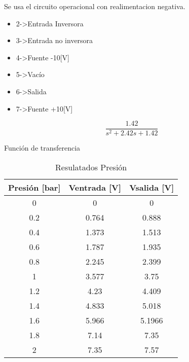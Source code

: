 \documentclass[]{article}
\begin{document}

Se usa el circuito operacional con realimentacion negativa.\\

\begin{itemize}
	
	\item 2->Entrada Inversora
	\item 3->Entrada no inversora
	\item 4->Fuente -10[V]
	\item 5->Vacío
	\item 6->Salida
	\item 7->Fuente +10[V]
\end{itemize}

\begin{equation}
  \frac{1.42}{s^2+2.42s+1.42}
\end{equation}

Función de transferencia



\begin{table}[h!]
	\centering
	\begin{tabular}{|c|c|c|}
		\hline
		Presión {[}bar{]} & Ventrada {[}V{]} & Vsalida {[}V{]} \\ \hline
		0                 & 0                & 0               \\ \hline
		0.2               & 0.764            & 0.888           \\ \hline
		0.4               & 1.373            & 1.513           \\ \hline
		0.6               & 1.787            & 1.935           \\ \hline
		0.8               & 2.245            & 2.399           \\ \hline
		1                 & 3.577            & 3.75            \\ \hline
		1.2               & 4.23             & 4.409           \\ \hline
		1.4               & 4.833            & 5.018           \\ \hline
		1.6               & 5.966            & 5.1966          \\ \hline
		1.8               & 7.14             & 7.35            \\ \hline
		2                 & 7.35             & 7.57            \\ \hline
	\end{tabular}
	\caption{Resulatados Presión}
	\label{tablaPresion}
\end{table}
\end{document}
